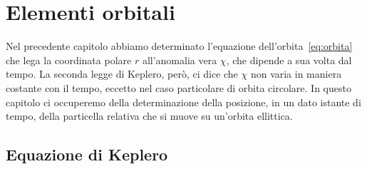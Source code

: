 \chapter{Elementi orbitali}
\label{chap:elementi-orbitali}

Nel precedente capitolo abbiamo determinato l'equazione
dell'orbita~\eqref{eq:orbita} che lega la coordinata polare $r$ all'anomalia
vera $\chi$, che dipende a sua volta dal tempo. La seconda legge di Keplero,
però, ci dice che $\chi$ non varia in maniera costante con il tempo, eccetto nel
caso particolare di orbita circolare. In questo capitolo ci occuperemo della
determinazione della posizione, in un dato istante di tempo, della particella
relativa che si muove su un'orbita ellittica.

\section{Equazione di Keplero}
\label{sec:equazione-keplero}

